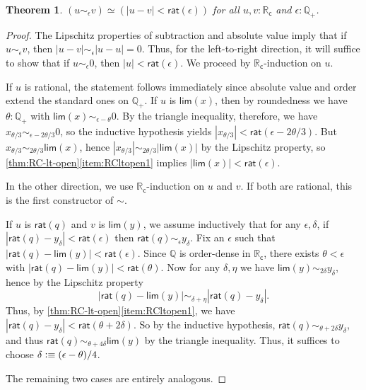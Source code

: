 \documentclass[10pt,a4paper]{article}
\providecommand{\index}[1]{}
\newcommand{\defeq}{\vcentcolon\equiv}  %
\newcommand{\eqv}[2]{\ensuremath{#1 \simeq #2}\xspace}
\newcommand{\Q}{\ensuremath{\mathbb{Q}}\xspace}
\newcommand{\RC}{\ensuremath{\mathbb{R}_\mathsf{c}}\xspace} %
\newcommand{\close}[1]{\sim_{#1}} %
\newcommand{\closesym}{\mathord\sim}
\newcommand{\rclim}{\mathsf{lim}} %
\newcommand{\rcrat}{\mathsf{rat}} %
\newcommand{\Qp}{\Q_{+}}
\newtheorem{thm}{Theorem}[section]
\theoremstyle{definition}
\theoremstyle{remark}
\numberwithin{equation}{section}
\begin{document}
\begin{thm} \label{RC-sim-eqv-le}
  \index{distance}%
  $\eqv{(u \close\epsilon v)}{(|u - v| < \rcrat(\epsilon))}$
  for all $u, v : \RC$ and $\epsilon : \Qp$.
\end{thm}

\begin{proof}
  The Lipschitz properties of subtraction and absolute value imply that if $u\close\epsilon v$, then $|u-v| \close\epsilon |u-u| = 0$.
  Thus, for the left-to-right direction, it will suffice to show that if $u\close\epsilon 0$, then $|u|<\rcrat(\epsilon)$.
  We proceed by $\RC$-induction on $u$.

  If $u$ is rational, the statement follows immediately since absolute value and order extend the standard ones on $\Qp$.
  If $u$ is $\rclim(x)$, then by roundedness we have $\theta:\Qp$ with $\rclim(x)\close{\epsilon-\theta} 0$.
  By the triangle inequality, therefore, we have $x_{\theta/3} \close{\epsilon-2\theta/3} 0$, so the inductive hypothesis yields $|x_{\theta/3}|<\rcrat(\epsilon-2\theta/3)$.
  But $x_{\theta/3} \close{2\theta/3} \rclim(x)$, hence $|x_{\theta/3}| \close{2\theta/3} |\rclim(x)|$ by the Lipschitz property, so \cref{thm:RC-lt-open}\ref{item:RCltopen1} implies $|\rclim(x)|<\rcrat(\epsilon)$.

  In the other direction, we use $\RC$-induction on $u$ and $v$.
  If both are rational, this is the first constructor of $\closesym$.

  If $u$ is $\rcrat(q)$ and $v$ is $\rclim(y)$, we assume inductively that for any $\epsilon,\delta$, if $|\rcrat(q)-y_\delta|<\rcrat(\epsilon)$ then $\rcrat(q) \close{\epsilon} y_\delta$.
  Fix an $\epsilon$ such that $|\rcrat(q) - \rclim(y)|<\rcrat(\epsilon)$.
  Since $\Q$ is order-dense in $\RC$, there exists $\theta<\epsilon$ with $|\rcrat(q) - \rclim(y)|<\rcrat(\theta)$.
  Now for any $\delta,\eta$ we have $\rclim(y)\close{2\delta} y_\delta$, hence by the Lipschitz property
  \[ |\rcrat(q) - \rclim(y)| \close{\delta+\eta} |\rcrat(q) - y_\delta|. \]
  Thus, by \cref{thm:RC-lt-open}\ref{item:RCltopen1}, we have $|\rcrat(q) - y_\delta| < \rcrat(\theta+2\delta)$.
  So by the inductive hypothesis, $\rcrat(q) \close{\theta+2\delta} y_\delta$, and thus $\rcrat(q)\close{\theta+4\delta} \rclim(y)$ by the triangle inequality.
  Thus, it suffices to choose $\delta \defeq (\epsilon-\theta)/4$.

  The remaining two cases are entirely analogous.
\end{proof}
\end{document}
